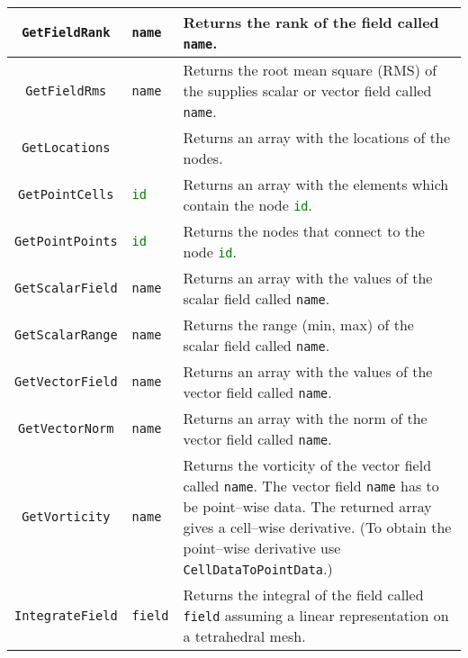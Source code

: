 \begin{landscape}
\begin{longtable}{|c | p{} |p{}|}
%
\lstinline[language=Python]+GetFieldRank+ & \lstinline[language=Python]+name+ & Returns the rank of the field called \lstinline[language=Python]+name+. \\ \hline
%
\lstinline[language=Python]+GetFieldRms+ & \lstinline[language=Python]+name+ & Returns the root mean square (RMS) of the supplies scalar or vector field called \lstinline[language=Python]+name+. \\ \hline
%
\lstinline[language=Python]+GetLocations+ & & Returns an array with the locations of the nodes. \\ \hline
%
\lstinline[language=Python]+GetPointCells+ & \lstinline[language=Python]+id+ & Returns an array with the elements which contain the node \lstinline[language=Python]+id+. \\ \hline
%
\lstinline[language=Python]+GetPointPoints+ & \lstinline[language=Python]+id+ & Returns the nodes that connect to the node \lstinline[language=Python]+id+. \\ \hline
%
\lstinline[language=Python]+GetScalarField+ & \lstinline[language=Python]+name+ & Returns an array with the values of the scalar field called \lstinline[language=Python]+name+. \\ \hline
%
\lstinline[language=Python]+GetScalarRange+ & \lstinline[language=Python]+name+ & Returns the range (min, max) of the scalar field called \lstinline[language=Python]+name+. \\ \hline
\lstinline[language=Python]+GetVectorField+ & \lstinline[language=Python]+name+ & Returns an array with the values of the vector field called \lstinline[language=Python]+name+. \\ \hline
%
\lstinline[language=Python]+GetVectorNorm+ & \lstinline[language=Python]+name+ & Returns an array with the norm of the vector field called \lstinline[language=Python]+name+. \\ \hline
%
\lstinline[language=Python]+GetVorticity+ & \lstinline[language=Python]+name+ & Returns the vorticity of the vector field called \lstinline[language=Python]+name+. The vector field \lstinline[language=Python]+name+ has to be point--wise data. The returned array gives a cell--wise derivative. (To obtain the point--wise derivative use \lstinline[language=Python]+CellDataToPointData+.) \\ \hline
%
\lstinline[language=Python]+IntegrateField+ & \lstinline[language=Python]+field+ & Returns the integral of the field called \lstinline[language=Python]+field+ assuming a linear representation on a tetrahedral mesh. \\ \hline

\end{longtable}
\end{landscape}
